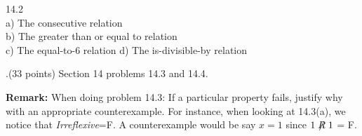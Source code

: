 \documentclass[12pt]{article}
\begin{document}
14.2 \\
\indetn a) The consecutive relation \\
\indent b) The greater than or equal to relation \\
\indent c) The equal-to-6 relation 
\indent d) The is-divisible-by relation

\vspace{.15in}

.(33 points) Section 14 problems 14.3 and 14.4.  
\vspace{.15in}

\noindent \textbf{Remark:} When doing problem 14.3:  If a particular property fails, justify why with an appropriate counterexample.  For instance, when looking at 14.3(a), we notice that \textit{Irreflexive}=F.  A counterexample would be say $x = 1$ since $1 \centernot{R} 1$ = F.  
\end{document}
